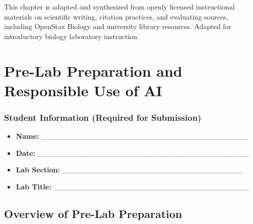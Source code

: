 \documentclass[
  letterpaper,
  DIV=11,
  numbers=noendperiod]{scrreprt}
\begin{document}

This chapter is adapted and synthesized from openly licensed
instructional materials on scientific writing, citation practices, and
evaluating sources, including OpenStax Biology and university library
resources. Adapted for introductory biology laboratory instruction.


\chapter*{\texorpdfstring{\textbf{Pre-Lab Preparation and Responsible
Use of
AI}}{Pre-Lab Preparation and Responsible Use of AI}}\label{pre-lab-preparation-and-responsible-use-of-ai}


\subsection*{\texorpdfstring{\textbf{Student Information (Required for
Submission)}}{Student Information (Required for Submission)}}\label{student-information-required-for-submission}

\begin{itemize}
\item
  \textbf{Name:}
  \_\_\_\_\_\_\_\_\_\_\_\_\_\_\_\_\_\_\_\_\_\_\_\_\_\_\_\_\_\_\_\_\_\_\_\_\_\_\_
\item
  \textbf{Date:}
  \_\_\_\_\_\_\_\_\_\_\_\_\_\_\_\_\_\_\_\_\_\_\_\_\_\_\_\_\_\_\_\_\_\_\_\_\_\_\_\_
\item
  \textbf{Lab Section:}
  \_\_\_\_\_\_\_\_\_\_\_\_\_\_\_\_\_\_\_\_\_\_\_\_\_\_\_\_\_\_\_\_\_\_
\item
  \textbf{Lab Title:}
  \_\_\_\_\_\_\_\_\_\_\_\_\_\_\_\_\_\_\_\_\_\_\_\_\_\_\_\_\_\_\_\_\_\_\_\_\_
\end{itemize}

\section*{\texorpdfstring{\textbf{Overview of Pre-Lab
Preparation}}{Overview of Pre-Lab Preparation}}\label{overview-of-pre-lab-preparation}
\end{document}
